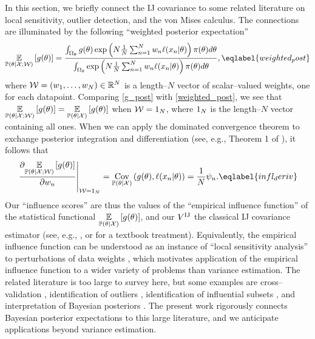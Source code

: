 In this section, we briefly connect the IJ covariance to some related
literature on local sensitivity, outlier detection, and
the von Mises calculus.  The connections are illuminated by the following
``weighted posterior expectation''
%
\begin{align}
    \expect{\postw}{\g(\theta)} =
        \frac{
        \int_{\thetadom} g(\theta)
            \exp\left(N \meann \w_n \ell(\x_n \vert \theta) \right) \prior(\theta)
                            d\theta}
             {\int_{\thetadom}
             \exp\left(N \meann \w_n \ell(\x_n \vert \theta) \right) \prior(\theta)
             d\theta},
             \eqlabel{weighted_post}
\end{align}
%
where $\mathcal{W} = (w_1, \ldots, w_N) \in \mathbb{R}^{N}$ is a length--$N$ vector
of scalar--valued weights, one for each datapoint.  Comparing
\eqref{g_post} with \eqref{weighted_post}, we see that
$\underset{\mathbb{P}(\theta | {\mathcal{X}}; \mathcal{W})}{\mathbb{E}}\left[g(\theta)\right] = \underset{\mathbb{P}(\theta | {\mathcal{X}})}{\mathbb{E}}\left[g(\theta)\right]$ when
$\mathcal{W} = 1_N$, where $1_N$ is the length--$N$ vector containing
all ones.  When we can apply the dominated convergence theorem to
exchange posterior integration and differentiation
(see, e.g., Theorem 1 of \citet{giordano:2018:covariances}), it follows that
%
\begin{align}
    \fracat{\partial \expect{\postw}{\g(\theta)}}{\partial \w_n}{\wvec = \onevec} =
    \cov{\post}{\g(\theta), \ell(\x_n \vert \theta)} = \frac{1}{N} \infl_n.
    \eqlabel{infl_deriv}
\end{align}
%
Our ``influence scores'' are thus the values of the
``empirical influence function'' of the statistical functional $\underset{\mathbb{P}(\theta | {\mathcal{X}})}{\mathbb{E}}\left[g(\theta)\right]$,
and our $V^{\mathrm{IJ}}$ the classical IJ covariance estimator
(see, e.g., \citet{mises:1947:asymptotic,reeds:1976:thesis,efron:1982:jackknife,hampel:2011:robustbook}, or
\citet{serfling:1980:approximation} for a textbook treatment).  Equivalently,
the empirical influence function can be understood as an instance of
``local sensitivity analysis'' to perturbations of data weights
\citep{gustafson:1996:localposterior,giordano:2018:covariances}, which
motivates application of the empirical influence function
to a wider variety of problems than variance estimation.
The related literature is too large to survey here, but
some examples are cross--validation
\citep{koh:2017:blackboxinfluence,giordano:2019:swiss}, identification
of outliers \citep{pregibon:1981:logistic,mcculloch:1989:localbayesianmodelinfluence,belsley:1980:regression},
identification of influential subsets \citep{giordano:2026:amip1,giordano:2026:amip2},
and interpretation of Bayesian posteriors
\citep{thomas:2018:reconcilingcurvatureandis,iba:2023:wkernel}.  The
present work rigorously connects Bayesian posterior expectations to this
large literature, and we anticipate applications beyond variance estimation.

